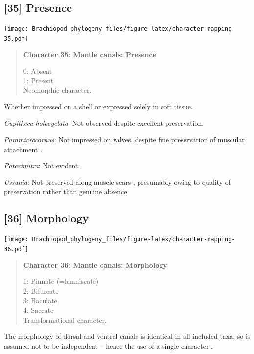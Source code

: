 \documentclass[openany]{book}
\begin{document}
\subsection*{{[}35{]} Presence}\label{presence}

\texttt{[image: Brachiopod\_phylogeny\_files/figure-latex/character-mapping-35.pdf]}

\begin{quote}
\textbf{Character 35: Mantle canals: Presence}

0: Absent\\
1: Present\\
Neomorphic character.
\end{quote}

Whether impressed on a shell or expressed solely in soft tissue.

\hypertarget{Cupitheca_holocyclata-coding-35}{}
\emph{Cupitheca holocyclata}: Not observed despite excellent
preservation.

\hypertarget{Paramicrocornus-coding-35}{}
\emph{Paramicrocornus}: Not impressed on valves, despite fine
preservation of muscular attachment \citep{Zhang2018Ahyolithid}.

\hypertarget{Paterimitra-coding-35}{}
\emph{Paterimitra}: Not evident.

\hypertarget{Ussunia-coding-35}{}
\emph{Ussunia}: Not preserved along muscle scars \citep{Nikitin1984},
presumably owing to quality of preservation rather than genuine absence.

\subsection*{{[}36{]} Morphology}\label{morphology-1}

\texttt{[image: Brachiopod\_phylogeny\_files/figure-latex/character-mapping-36.pdf]}

\begin{quote}
\textbf{Character 36: Mantle canals: Morphology}

1: Pinnate (=lemniscate)\\
2: Bifurcate\\
3: Baculate\\
4: Saccate\\
Transformational character.
\end{quote}

The morphology of dorsal and ventral canals is identical in all included
taxa, so is assumed not to be independent -- hence the use of a single
character \citep[contra][]{Williams2000LinguliformeaCraniiformea}.
\end{document}
